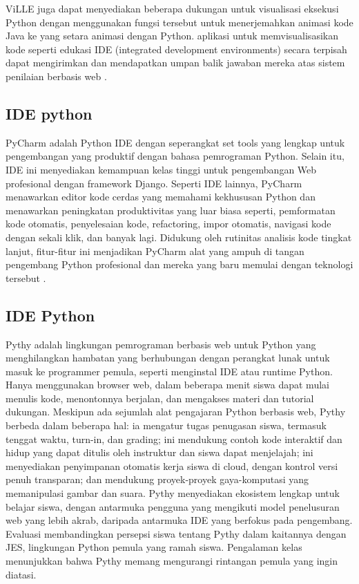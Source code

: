 ViLLE  juga dapat menyediakan beberapa dukungan untuk visualisasi eksekusi Python dengan menggunakan fungsi tersebut untuk menerjemahkan animasi kode Java ke yang setara animasi dengan Python. aplikasi untuk memvisualisasikan kode seperti edukasi IDE (integrated development environments) secara terpisah dapat mengirimkan dan mendapatkan umpan balik jawaban mereka atas sistem penilaian berbasis web \cite{helminen2010jype}.

\subsection{IDE python}
PyCharm adalah Python IDE dengan seperangkat set tools yang lengkap untuk pengembangan yang produktif dengan bahasa pemrograman Python. Selain itu, IDE ini menyediakan kemampuan kelas tinggi untuk pengembangan Web profesional dengan framework Django. Seperti IDE lainnya, PyCharm menawarkan editor kode cerdas yang memahami kekhususan Python dan menawarkan peningkatan produktivitas yang luar biasa seperti, pemformatan kode otomatis, penyelesaian kode, refactoring, impor otomatis, navigasi kode dengan sekali klik, dan banyak lagi. Didukung oleh rutinitas analisis kode tingkat lanjut, fitur-fitur ini menjadikan PyCharm alat yang ampuh di tangan pengembang Python profesional dan mereka yang baru memulai dengan teknologi tersebut \cite{fifli2016pirhoogammarhoalphamumualpha}.

\subsection{IDE Python}
Pythy adalah lingkungan pemrograman berbasis web untuk Python yang menghilangkan hambatan yang berhubungan dengan perangkat lunak untuk masuk ke programmer pemula, seperti menginstal IDE atau runtime Python. Hanya menggunakan browser web, dalam beberapa menit siswa dapat mulai menulis kode, menontonnya berjalan, dan mengakses materi dan tutorial dukungan. Meskipun ada sejumlah alat pengajaran Python berbasis web, Pythy berbeda dalam beberapa hal: ia mengatur tugas penugasan siswa, termasuk tenggat waktu, turn-in, dan grading; ini mendukung contoh kode interaktif dan hidup yang dapat ditulis oleh instruktur dan siswa dapat menjelajah; ini menyediakan penyimpanan otomatis kerja siswa di cloud, dengan kontrol versi penuh transparan; dan mendukung proyek-proyek gaya-komputasi yang memanipulasi gambar dan suara. Pythy menyediakan ekosistem lengkap untuk belajar siswa, dengan antarmuka pengguna yang mengikuti model penelusuran web yang lebih akrab, daripada antarmuka IDE yang berfokus pada pengembang. Evaluasi membandingkan persepsi siswa tentang Pythy dalam kaitannya dengan JES, lingkungan Python pemula yang ramah siswa. Pengalaman kelas menunjukkan bahwa Pythy memang mengurangi rintangan pemula yang ingin diatasi. \cite{edwards2014pythy}
